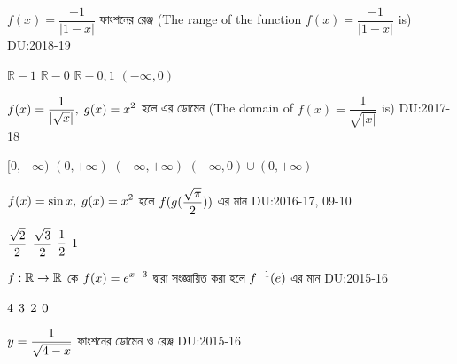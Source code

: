 \documentclass[addpoints]{exam}
\begin{document}
\begin{center}
\end{center}

\vspace{5mm}


\begin{questions}

\question   $ f(x) = \dfrac{-1}{|1-x|} $  ফাংশনের রেঞ্জ (The range of the function $ f(x) = \dfrac{-1}{|1-x|} $ is) \hfill \textsc{DU:2018-19}

\begin{oneparchoices}
\choice $ \mathbb{R}-{1} $
\choice $ \mathbb{R}-{0} $
\choice $ \mathbb{R}-{0,1} $
\choice  $ (-\infty, 0) $

\end{oneparchoices}
\question $\mathlarger{ f(x) = \dfrac{1}{|\sqrt{x}|}, \; g(x)=x^2}$  হলে এর ডোমেন (The domain of  $ f(x) = \dfrac{1}{\sqrt{|x|}} $ is) \hfill \textsc{DU:2017-18}

\begin{oneparchoices}
\choice $ [0,+\infty) $
\choice $ (0,+\infty) $
\choice $ (-\infty, +\infty) $
\choice $ (-\infty, 0)\cup (0, +\infty)  $

\end{oneparchoices}

\question $\mathlarger{ f(x) = \sin x, \; g(x)=x^2}$  হলে  $\mathlarger{f(g(\frac{\sqrt{\pi}}{2}))}$ এর মান \hfill \textsc{DU:2016-17, 09-10}

\begin{oneparchoices}
  \choice $\mathlarger{\frac{\sqrt{2}}{2} }$
 \choice $\mathlarger{\frac{\sqrt{3}}{2} }$
 \choice $\mathlarger{\frac{1}{2} }$
 \choice $\mathlarger{1}$
\end{oneparchoices}
\question $\mathlarger{f:\mathbb{R} \rightarrow \mathbb{R}}$ কে $\mathlarger{f(x)=e^{x-3}}$ দ্বারা সংজ্ঞায়িত করা হলে $\mathlarger{f^{-1}(e)}$ এর মান  \hfill \textsc{DU:2015-16}

\begin{oneparchoices}
 \choice $\mathlarger{4}$
 \choice $\mathlarger{3}$
 \choice $\mathlarger{2}$
 \choice $\mathlarger{0}$
\end{oneparchoices}


\question $\mathlarger{y=\frac{1}{\sqrt{4-x}}}$ ফাংশনের ডোমেন ও রেঞ্জ \hfill \textsc{DU:2015-16}


\end{questions}
\end{document}
